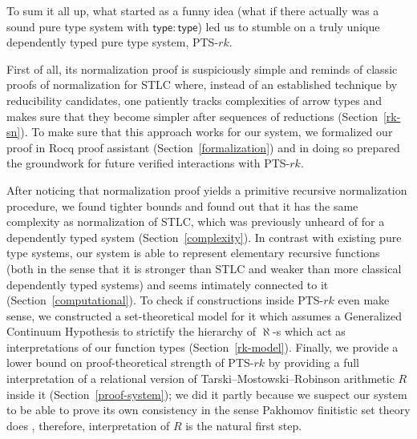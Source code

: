 \documentclass{article}
\theoremstyle{definition}
\theoremstyle{remark}
\begin{document}
To sum it all up, what started as a funny idea (what if
there actually was a sound pure type system with
$\mathsf{type}:\mathsf{type}$) led us to stumble on a
truly unique dependently typed pure type system,
PTS-$rk$.

First of all, its normalization proof is suspiciously
simple and reminds of classic proofs of normalization
for STLC where, instead of an established technique by
reducibility candidates, one patiently tracks
complexities of arrow types and makes sure that they
become simpler after sequences of reductions
(Section~\ref{rk-sn}). To make sure that this approach
works for our system, we formalized our proof in Rocq
proof assistant (Section~\ref{formalization}) and in
doing so prepared the groundwork for future verified
interactions with PTS-$rk$.

After noticing that normalization proof yields a
primitive recursive normalization procedure, we found
tighter bounds and found out that it has the same
complexity as normalization of STLC, which was
previously unheard of for a dependently typed system
(Section~\ref{complexity}). In contrast with existing
pure type systems, our system is able to represent
elementary recursive functions (both in the sense that
it is stronger than STLC and weaker than more classical
dependently typed systems) and seems intimately
connected to it (Section~\ref{computational}). To
check if constructions inside PTS-$rk$ even make sense,
we constructed a set-theoretical model for it which
assumes a Generalized Continuum Hypothesis to
strictify the hierarchy of $\aleph$-s which act as
interpretations of our function types
(Section~\ref{rk-model}). Finally, we provide a lower
bound on proof-theoretical strength of PTS-$rk$ by
providing a full interpretation of a relational version
of Tarski--Mostowski--Robinson arithmetic $R$ inside it
(Section~\ref{proof-system}); we did it partly because
we suspect our system to be able to prove its own
consistency in the sense Pakhomov finitistic set theory
does \cite{Pakhomov2019AWeakSet}, therefore,
interpretation of $R$ is the natural first step.

\printbibliography
\end{document}
